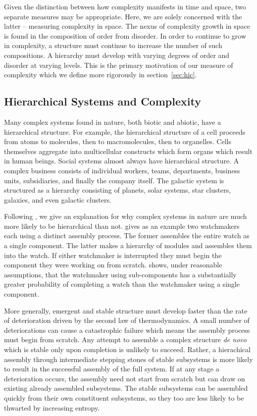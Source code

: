Given the distinction between how complexity manifests in time and space, two
separate measures may be appropriate. Here, we are solely concerned with the
latter -- measuring complexity in space. The nexus of complexity growth in space
is found in the composition of order from disorder. In order to continue to
grow in complexity, a structure must continue to increase the number of such
compositions. A hierarchy must develop with varying degrees of order and
disorder at varying levels. This is the primary motivation of our measure of
complexity which we define more rigorously in section~\ref{sec:hic}.

\subsection{Hierarchical Systems and Complexity}
\label{sec:hierarchy_and_complexity}

Many complex systems found in nature, both biotic and abiotic, have a
hierarchical structure. For example, the hierarchical structure of a cell
proceeds from atoms to molecules, then to macromolecules, then
to organelles. Cells themselves aggregate into multicellular constructs which form
organs which result in human beings. Social systems almost always have
hierarchical structure. A complex business consists of individual workers,
teams, departments, business units, subsidiaries, and finally the company itself.
The galactic system is structured as a hierarchy consisting of
planets, solar systems, star clusters, galaxies, and even galactic clusters.

Following \citet{simon1991architecture}, we give an explanation for why complex
systems in nature are much more likely to be hierarchical than not.
\citet{simon1991architecture} gives as an example two watchmakers each using a
distinct assembly process. The former assembles the entire watch as a single
component. The latter makes a hierarchy of modules and assembles them into the
watch. If either watchmaker is interrupted they must begin the component they
were working on from scratch. \citet{simon1991architecture} shows, under
reasonable assumptions, that the watchmaker using sub-components has a
substantially greater probability of completing a watch than the watchmaker
using a single component.

More generally, emergent and stable structure must develop faster than the rate
of deterioration driven by the second law of thermodynamics. A small number of
deteriorations can cause a catastrophic failure which means the assembly process
must begin from scratch. Any attempt to assemble a complex structure \emph{de
novo} which is stable only upon completion is unlikely to succeed. Rather, a
hierachical assembly through intermediate stepping stones of stable subsystems
is more likely to result in the successful assembly of the full system. If at
any stage a deterioration occurs, the assembly need not start from scratch but
can draw on existing already assembled subsystems. The stable subsystems can be
assembled quickly from their own constituent subsystems, so they too are less
likely to be thwarted by increasing entropy.

